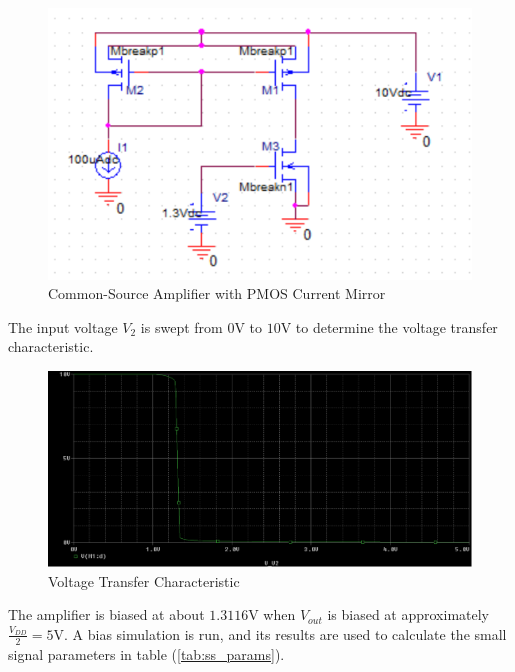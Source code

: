 \FloatBarrier

\begin{figure}[h!]
	\centering
	\includegraphics[scale=0.75]{./images/circuit2.PNG}
	\caption{Common-Source Amplifier with PMOS Current Mirror}
	\label{fig:circuit2}
\end{figure}

\FloatBarrier

The input voltage $V_2$ is swept from $0$\si{\volt} to $10$\si{\volt} to determine the voltage transfer characteristic.

\FloatBarrier

\begin{figure}[h!]
	\centering
	\includegraphics[scale=0.50]{./images/circuit5_vtc.PNG}
	\caption{Voltage Transfer Characteristic}
	\label{fig:circuit5_vtc}
\end{figure}

\FloatBarrier

The amplifier is biased at about $1.3116$\si{\volt} when $V_{out}$ is biased at approximately $\frac{V_{DD}}{2} = 5$\si{\volt}. A bias simulation is run, and its results are used to calculate the small signal parameters in table (\ref{tab:ss_params}).

